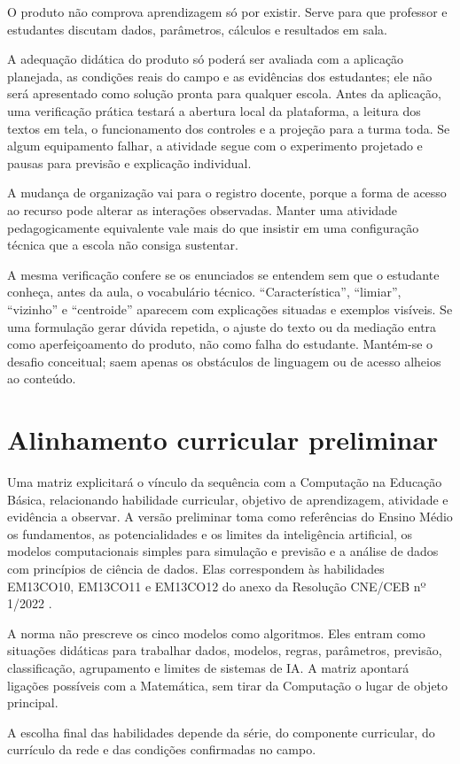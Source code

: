 O produto não comprova aprendizagem só por existir. Serve para que professor e estudantes discutam dados, parâmetros, cálculos e resultados em sala.

A adequação didática do produto só poderá ser avaliada com a aplicação planejada, as condições reais do campo e as evidências dos estudantes; ele não será apresentado como solução pronta para qualquer escola. Antes da aplicação, uma verificação prática testará a abertura local da plataforma, a leitura dos textos em tela, o funcionamento dos controles e a projeção para a turma toda. Se algum equipamento falhar, a atividade segue com o experimento projetado e pausas para previsão e explicação individual.

A mudança de organização vai para o registro docente, porque a forma de acesso ao recurso pode alterar as interações observadas. Manter uma atividade pedagogicamente equivalente vale mais do que insistir em uma configuração técnica que a escola não consiga sustentar.

A mesma verificação confere se os enunciados se entendem sem que o estudante conheça, antes da aula, o vocabulário técnico. ``Característica'', ``limiar'', ``vizinho'' e ``centroide'' aparecem com explicações situadas e exemplos visíveis. Se uma formulação gerar dúvida repetida, o ajuste do texto ou da mediação entra como aperfeiçoamento do produto, não como falha do estudante. Mantém-se o desafio conceitual; saem apenas os obstáculos de linguagem ou de acesso alheios ao conteúdo.

\section{Alinhamento curricular preliminar}

Uma matriz explicitará o vínculo da sequência com a Computação na Educação Básica, relacionando habilidade curricular, objetivo de aprendizagem, atividade e evidência a observar. A versão preliminar toma como referências do Ensino Médio os fundamentos, as potencialidades e os limites da inteligência artificial, os modelos computacionais simples para simulação e previsão e a análise de dados com princípios de ciência de dados. Elas correspondem às habilidades EM13CO10, EM13CO11 e EM13CO12 do anexo da Resolução CNE/CEB nº 1/2022 \cite{brasil2022computacao}.

A norma não prescreve os cinco modelos como algoritmos. Eles entram como situações didáticas para trabalhar dados, modelos, regras, parâmetros, previsão, classificação, agrupamento e limites de sistemas de IA. A matriz apontará ligações possíveis com a Matemática, sem tirar da Computação o lugar de objeto principal.

A escolha final das habilidades depende da série, do componente curricular, do currículo da rede e das condições confirmadas no campo.

